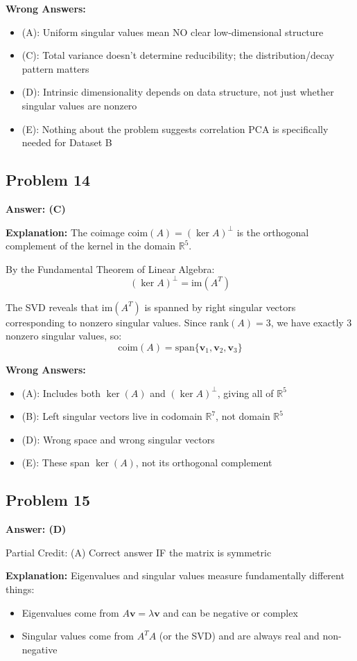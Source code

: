 \documentclass[12pt]{amsart}
\newcommand{\correct}[1]{{\color{correctgreen}\textbf{#1}}}
\newcommand{\partcred}[1]{{\color{partialblue}#1}}
\begin{document}
\begin{itemize}
\textbf{Wrong Answers:}
\begin{itemize}
\item (A): Uniform singular values mean NO clear low-dimensional structure
\item (C): Total variance doesn't determine reducibility; the distribution/decay pattern matters
\item (D): Intrinsic dimensionality depends on data structure, not just whether singular values are nonzero
\item (E): Nothing about the problem suggests correlation PCA is specifically needed for Dataset B
\end{itemize}

\subsection*{Problem 14}
\correct{Answer: (C)}

\textbf{Explanation:} The coimage $\text{coim}(A) = (\ker A)^\perp$ is the orthogonal complement of the kernel in the domain $\mathbb{R}^5$.

By the Fundamental Theorem of Linear Algebra:
$$(\ker A)^\perp = \text{im}(A^T)$$

The SVD reveals that $\text{im}(A^T)$ is spanned by right singular vectors corresponding to nonzero singular values. Since $\text{rank}(A) = 3$, we have exactly 3 nonzero singular values, so:
$$\text{coim}(A) = \text{span}\{\mathbf{v}_1, \mathbf{v}_2, \mathbf{v}_3\}$$

\textbf{Wrong Answers:}
\begin{itemize}
\item (A): Includes both $\ker(A)$ and $(\ker A)^\perp$, giving all of $\mathbb{R}^5$
\item (B): Left singular vectors live in codomain $\mathbb{R}^7$, not domain $\mathbb{R}^5$
\item (D): Wrong space and wrong singular vectors
\item (E): These span $\ker(A)$, not its orthogonal complement
\end{itemize}

\subsection*{Problem 15}
\correct{Answer: (D)}

\partcred{Partial Credit: (A) Correct answer IF the matrix is symmetric}

\textbf{Explanation:} Eigenvalues and singular values measure fundamentally different things:
\begin{itemize}
\item Eigenvalues come from $A\mathbf{v} = \lambda\mathbf{v}$ and can be negative or complex
\item Singular values come from $A^TA$ (or the SVD) and are always real and non-negative
\end{itemize}


\end{itemize}
\end{document}
